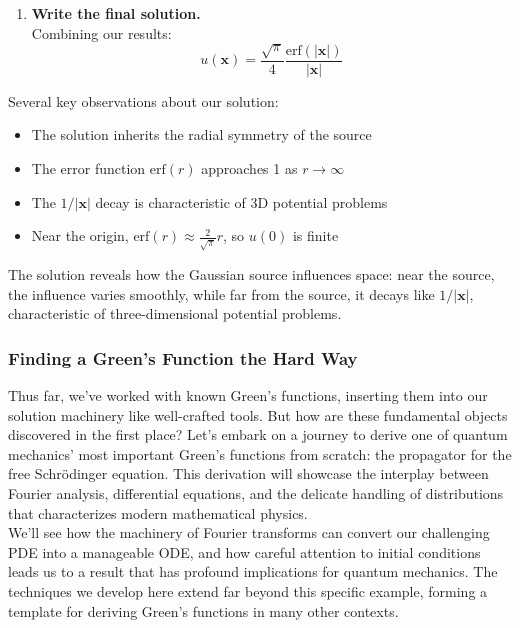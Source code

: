 \begin{example}
\begin{solution}
\begin{enumerate}
\item \textbf{Write the final solution.} \\
Combining our results:
\[
u(\mathbf{x}) = \frac{\sqrt{\pi}}{4}\frac{\text{erf}(|\mathbf{x}|)}{|\mathbf{x}|}
\]
\end{enumerate}

\noindent Several key observations about our solution:
\begin{itemize}
   \item The solution inherits the radial symmetry of the source
   \item The error function \(\text{erf}(r)\) approaches 1 as \(r \to \infty\)
   \item The \(1/|\mathbf{x}|\) decay is characteristic of 3D potential problems
   \item Near the origin, \(\text{erf}(r) \approx \frac{2}{\sqrt{\pi}}r\), so \(u(0)\) is finite
\end{itemize}

\noindent The solution reveals how the Gaussian source influences space: near the source, the influence varies smoothly, while far from the source, it decays like \(1/|\mathbf{x}|\), characteristic of three-dimensional potential problems.
\end{solution}
\end{example}
\exampleline

\subsubsection*{Finding a Green's Function the Hard Way} 

\noindent Thus far, we've worked with known Green's functions, inserting them into our solution machinery like well-crafted tools. But how are these fundamental objects discovered in the first place? Let's embark on a journey to derive one of quantum mechanics' most important Green's functions from scratch: the propagator for the free Schrödinger equation. This derivation will showcase the interplay between Fourier analysis, differential equations, and the delicate handling of distributions that characterizes modern mathematical physics. \\

\noindent We'll see how the machinery of Fourier transforms can convert our challenging PDE into a manageable ODE, and how careful attention to initial conditions leads us to a result that has profound implications for quantum mechanics. The techniques we develop here extend far beyond this specific example, forming a template for deriving Green's functions in many other contexts. \\

